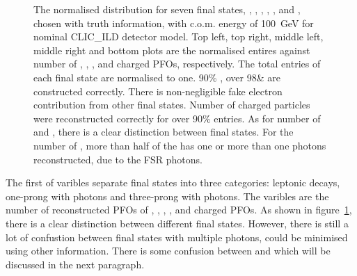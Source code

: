 \documentclass[a4paper,11pt]{article}
\begin{document}
\begin{figure}[htbp]
\caption{\label{fig:nPfos} The normalised distribution for seven final states, \Pem\APnue\Pnu, \Pmuon\APnum\Pnut, \Ppiminus\Pnut, \Pphoton\Pnut, \Pphoton\Pnut, \Ppiminus\Pnut and \Pphoton\Pnut, chosen with truth information,  with c.o.m. energy of 100 \,GeV for nominal CLIC\_ILD detector model. Top left, top right, middle left, middle right and bottom plots are the normalised entires against number of \Pepm, \Pmupm, \Pphoton, \Ppipm and charged PFOs, respectively. The total entries of each final state are normalised to one. 90\% \Pepm, over 98\& \Pmupm are constructed correctly. There is non-negligible fake electron contribution from other final states. Number of charged particles were reconstructed correctly for over 90\% entries. As for number of \Pphoton and \Ppipm, there is a clear distinction between final states. For the  number of \Pphoton, more than half of the \Pem\APnue\Pnu has one or more than one photons reconstructed, due to the FSR photons.
}
\end{figure}


The first of varibles separate final states into three categories: leptonic decays, one-prong with photons and three-prong with photons. The varibles are the number of reconstructed PFOs of \Pmupm, \Pepm, \Pphoton, \Ppipm, and charged PFOs. As shown in figure~\ref{fig:nPfos}, there is a clear distinction between different final states. However, there is still  a lot of confustion between final states with multiple photons, could be minimised using other information. There is some confusion between \Pepm and \Ppipm which will be discussed in the next paragraph.

\end{document}

